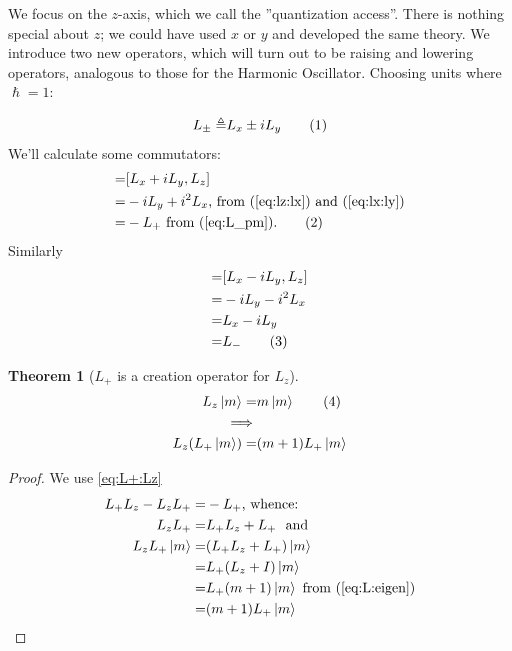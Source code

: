 \documentclass[]{article}
\newcommand\numberthis{\addtocounter{equation}{1}\tag{\theequation}}
\newtheorem{thm}{Theorem}
\begin{document}
We focus on the $z$-axis, which we call the ''quantization access''. There is nothing special about $z$; we could have used $x$ or $y$ and developed the same theory. We introduce two new  operators, which will turn out to be raising and lowering operators, analogous to those for the Harmonic Oscillator. Choosing units where $\hslash=1$:

\begin{align*}
	L_\pm \triangleq& L_x \pm i L_y \numberthis \label{eq:L_pm} \\
\end{align*}
We'll calculate some commutators:
\begin{align*}
	[L_+,L_z] =& [L_x+i L_y,L_z]\\
	=& -iL_y + i^2 L_x \text{, from (\ref{eq:lz:lx}) and (\ref{eq:lx:ly})}\\
	=& -L_+ \text{ from (\ref{eq:L_pm}).} \numberthis \label{eq:L+:Lz}\\
\end{align*}
Similarly
\begin{align*}
	[L_-,L_z]  =& [L_x-i L_y,L_z]\\
	=&-iL_y - i^2 L_x\\
	=& L_x-iL_y\\
	=& L_- \numberthis \label{eq:L-:Lz}
\end{align*}

\begin{thm}[$L_+$ is a creation operator for $L_z$] \label{thm:angular:momentum:creation}
	\begin{align*}
		L_z \ket{m} =& m \ket{m} \numberthis \label{eq:L:eigen}\\
		\implies&\\
		L_z (L_+ \ket{m}) =& (m+1) L_+ \ket{m}
	\end{align*}	
\end{thm}

\begin{proof}
	We use 	\eqref{eq:L+:Lz}
	\begin{align*}
		L_+L_z-L_zL_+ =& -L_+ \text{, whence:}\\
		L_zL_+ =& L_+L_z + L_+\ \text{ and}\\
		L_z L_+ \ket{m} =& (L_+L_z + L_+)\ket{m}\\
		=& L_+ (L_z + I)\ket{m}\\
		=& L_+ (m + 1) \ket{m} \text{ from (\ref{eq:L:eigen})}\\
		=&  (m + 1) L_+ \ket{m}
	\end{align*}
\end{proof}
\end{document}
